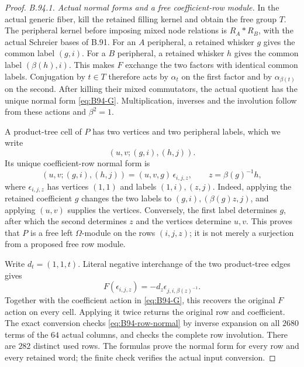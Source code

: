 \begin{proof}
\emph{B.94.1. Actual normal forms and a free coefficient-row module.}
In the actual generic fiber, kill the retained filling kernel and
obtain the free group $T$. The peripheral kernel before imposing
mixed node relations is $R_A*R_B$, with the actual Schreier bases
of B.91. For an $A$ peripheral, a retained whisker $g$ gives the
common label $(g,i)$. For a $B$ peripheral, a retained whisker $h$
gives the common label $(\beta(h),i)$. This makes $F$ exchange
the two factors with identical common labels. Conjugation by
$t\in T$ therefore acts by $\alpha_t$ on the first factor and
by $\alpha_{\beta(t)}$ on the second. After killing their mixed
commutators, the actual quotient has the unique normal form
\eqref{eq:B94-G}. Multiplication, inverses and the involution
follow from these actions and $\beta^2=1$.

A product-tree cell of $P$ has two vertices and two peripheral
labels, which we write
\[
                         (u,v;(g,i),(h,j)).
\]
Its unique coefficient-row normal form is
\begin{equation}\label{eq:B94-row-normal}
 (u,v;(g,i),(h,j))=(u,v,g)\,\epsilon_{i,j,z},
                  \qquad z=\beta(g)^{-1}h,
\end{equation}
where $\epsilon_{i,j,z}$ has vertices $(1,1)$ and labels
$(1,i),(z,j)$. Indeed, applying the retained coefficient $g$
changes the two labels to $(g,i),(\beta(g)z,j)$, and applying
$(u,v)$ supplies the vertices. Conversely, the first label
determines $g$, after which the second determines $z$ and the
vertices determine $u,v$. This proves that $P$ is a free left
$\Omega$-module on the rows $(i,j,z)$; it is not merely a
surjection from a proposed free row module.

Write $d_t=(1,1,t)$. Literal negative interchange of the two
product-tree edges gives
\begin{equation}\label{eq:B94-row-F}
 F(\epsilon_{i,j,z})
       =-d_z\epsilon_{j,i,\beta(z)^{-1}}.
\end{equation}
Together with the coefficient action in \eqref{eq:B94-G}, this
recovers the original $F$ action on every cell. Applying it twice
returns the original row and coefficient. The exact conversion
checks \eqref{eq:B94-row-normal} by inverse expansion on all
$2680$ terms of the $64$ actual columns, and checks the complete
row involution. There are $282$ distinct used rows. The formulas
prove the normal form for every row and every retained word;
the finite check verifies the actual input conversion.


\end{proof}
